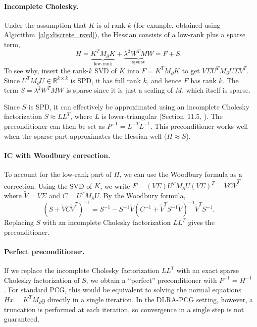 \paragraph{Incomplete Cholesky.} Under the assumption that $K$ is of rank $k$ (for example, obtained using Algorithm~\ref{alg:discrete_rsvd}), the Hessian consists of a low-rank plus a sparse term,
\begin{equation*}
    H = \underbrace{K^T M_\partial K}_{\text{low-rank}}
    + \underbrace{\lambda^2 W^T M W}_{\text{sparse}}
    = F + S.
\end{equation*}
To see why, insert the rank-$k$ SVD of $K$ into $F = K^T M_\partial K$ to get $V \Sigma U^T M_\partial U \Sigma V^T$. Since $U^T M_\partial U \in \mathbb{R}^{k \times k}$ is SPD, it has full rank $k$, and hence $F$ has rank $k$. The term $S = \lambda^2 W^T M W$ is sparse since it is just a scaling of $M$, which itself is sparse.

Since $S$ is SPD, it can effectively be approximated using an incomplete Cholesky factorization $S \approx L L^T$, where $L$ is lower-triangular (Section~11.5, \cite{golubMatrixComputations4th2013}). The preconditioner can then be set as $P^{-1} = L^{-T} L^{-1}$. This preconditioner works well when the sparse part approximates the Hessian well ($H \approx S$).

\paragraph{IC with Woodbury correction.}
To account for the low-rank part of $H$, we can use the Woodbury formula \cite{woodbury1950inverting} as a correction. Using the SVD of $K$, we write $F = (V \Sigma) U^T M_\partial U (V \Sigma)^T = \tilde V C \tilde V^T$ where $\tilde V = V \Sigma$ and $C = U^T M_\partial U$. By the Woodbury formula,
\begin{equation*}
    (S + \tilde{V} C \tilde{V}^T)^{-1} =
    S^{-1} - S^{-1}\tilde{V}(C^{-1} + \tilde{V}^T S^{-1} \tilde{V})^{-1}\tilde{V}^T S^{-1}.
\end{equation*}
Replacing $S$ with an incomplete Cholesky factorization $L L^T$ gives the preconditioner.

\paragraph{Perfect preconditioner.} If we replace the incomplete Cholesky factorization $L L^T$ with an exact sparse Cholesky factorization of $S$, we obtain a ``perfect'' preconditioner with $P^{-1} = H^{-1}$. For standard PCG, this would be equivalent to solving the normal equations $Hx = K^T M_\partial y$ directly in a single iteration. In the DLRA-PCG setting, however, a truncation is performed at each iteration, so convergence in a single step is not guaranteed.

